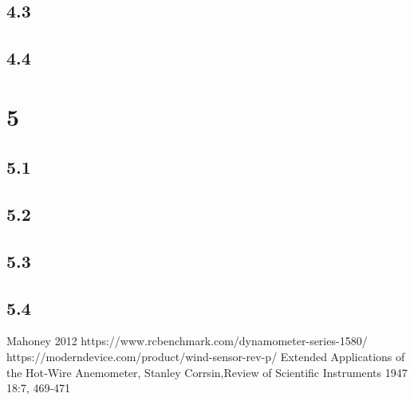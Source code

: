 \documentclass[twocolumn]{article}
\begin{document}
	\subsection{4.3}
	\subsection{4.4}
	
	\section{5}

	\subsection{5.1}
	\subsection{5.2}
	\subsection{5.3}
	\subsection{5.4}

	
	

	\begin{thebibliography}{99}
		 Mahoney 2012
		 https://www.rcbenchmark.com/dynamometer-series-1580/
		 https://moderndevice.com/product/wind-sensor-rev-p/
		 Extended Applications of the Hot‐Wire Anemometer, Stanley Corrsin,Review of Scientific Instruments 1947 18:7, 469-471 
		
	\end{thebibliography}
\end{document}
